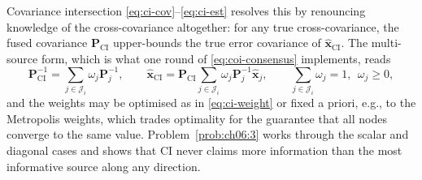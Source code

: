 Covariance intersection \eqref{eq:ci-cov}--\eqref{eq:ci-est} \cite{julier1997nondivergent} resolves this by renouncing knowledge of the cross-covariance altogether: for any true cross-covariance, the fused covariance $\mathbf{P}_{\mathrm{CI}}$ upper-bounds the true error covariance of $\widehat{\mathbf{x}}_{\mathrm{CI}}$. The multi-source form, which is what one round of \eqref{eq:coi-consensus} implements, reads
\begin{equation}
\mathbf{P}_{\mathrm{CI}}^{-1}=\sum_{j\in\mathcal{J}_i}\omega_j\mathbf{P}_j^{-1},\qquad
\widehat{\mathbf{x}}_{\mathrm{CI}}=\mathbf{P}_{\mathrm{CI}}\sum_{j\in\mathcal{J}_i}\omega_j\mathbf{P}_j^{-1}\widehat{\mathbf{x}}_j,\qquad
\sum_{j\in\mathcal{J}_i}\omega_j=1,\ \ \omega_j\ge0,
\label{eq:ci-multi}
\end{equation}
and the weights may be optimised as in \eqref{eq:ci-weight} or fixed a priori, e.g., to the Metropolis weights, which trades optimality for the guarantee that all nodes converge to the same value. Problem~\ref{prob:ch06:3} works through the scalar and diagonal cases and shows that CI never claims more information than the most informative source along any direction.

